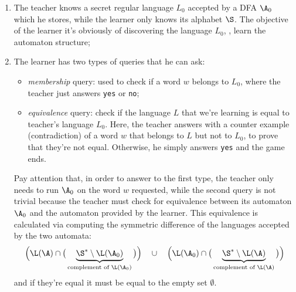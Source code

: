 \documentclass[oneside]{academica}
\begin{document}
\begin{enumerate}
  \item The teacher knows a secret regular language $L_0$ accepted by a DFA $\A_0$ which he stores, while the learner only knows its alphabet $\S$. The objective of the learner it's obviously of discovering the language $L_0$, \ie, learn the automaton structure;

  \newpage
  \item The learner has two types of queries that he can ask:
    \begin{itemize}
      \item \emph{membership} query: used to check if a word $w$ belongs to $L_0$, where the teacher just answers \texttt{yes} or \texttt{no};
      \item \emph{equivalence} query: check if the language $L$ that we're learning is equal to teacher's language $L_0$.
        Here, the teacher answers with a counter example (contradiction) of a word $w$ that belongs to $L$ but not to $L_0$, to prove that they're not equal.
        Otherwise, he simply answers \texttt{yes} and the game ends.
    \end{itemize}
    Pay attention that, in order to answer to the first type, the teacher only needs to run $\A_0$ on the word $w$ requested, while the second query is not trivial because the teacher must check for equivalence between its automaton $\A_0$ and the automaton provided by the learner.
    This equivalence is calculated via computing the symmetric difference of the languages accepted by the two automata:
    \begin{equation*}
      \Big( \L(\A) \cap \big(\underbrace{\S^* \setminus \L(\A_0)}_{\text{complement of } \L(\A_0)}\big) \Big) \quad \cup \quad \Big( \L(\A_0) \cap \big(\underbrace{\S^* \setminus \L(\A)}_{\text{complement of } \L(\A)}\big) \Big)
    \end{equation*}
    and if they're equal it must be equal to the empty set $\emptyset$.
\end{enumerate}
\end{document}
